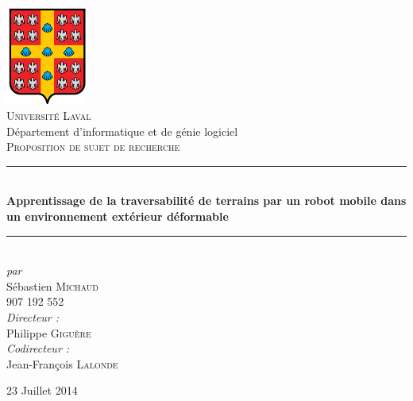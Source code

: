 \newcommand{\HRule}{\rule{\linewidth}{0.5mm}}
\begin{titlepage}
\begin{center}

\includegraphics[width=0.2\textwidth]{LogoUL.png}~\\[0.2cm]

\textsc{\LARGE Université Laval}\\
Département d'informatique et de génie logiciel\\[0.6cm]

\textsc{\Large Proposition de sujet de recherche}\\[0.4cm]

\HRule \\[0.3cm]
{ \Large \bfseries Apprentissage de la traversabilité de terrains par un robot mobile dans un environnement extérieur déformable \\[0.3cm] }
\HRule \\[1cm]

\large
\emph{par}\\
Sébastien \textsc{Michaud}\\
907 192 552 \\[0.8cm]

\large
\emph{Directeur :} \\
Philippe \textsc{Giguère} \\[0.3cm]
\emph{Codirecteur :} \\
Jean-François \textsc{Lalonde} \\%

\vfill

{\large 23 Juillet 2014}

\end{center}
\end{titlepage}

